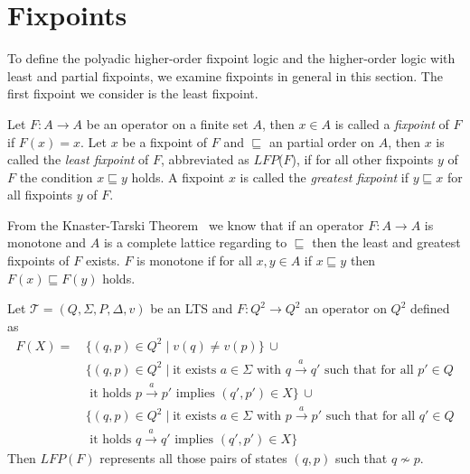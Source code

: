 
\section{Fixpoints}\label{sec:fixpoints}

To define the polyadic higher-order fixpoint logic and the higher-order logic with least and partial fixpoints, we examine fixpoints in general in this section. The first fixpoint we consider is the least fixpoint.

\begin{definition}
   Let $F\colon A \rightarrow A$ be an operator on a finite set $A$, then $x \in A$
   is called a \emph{fixpoint} of $F$ if $F(x) = x$. Let $x$ be a fixpoint of $F$ and $\sqsubseteq$ an partial order on $A$, then $x$ is called the \emph{least
   fixpoint} of $F$, abbreviated as $\mathit{LFP}$($F$), if for all other fixpoints $y$ of $F$ the condition $x
   \sqsubseteq y$ holds. A fixpoint $x$ is called the \emph{greatest fixpoint} if $y \sqsubseteq x$ for all fixpoints $y$ of $F$.
\end{definition}

From the Knaster-Tarski Theorem~\cite{tarski1955lattice} we know that if an operator $F\colon A \rightarrow 
A$ is monotone and $A$ is a complete lattice regarding to $\sqsubseteq$ then the least and greatest fixpoints of $F$ exists. $F$ is monotone if for all $x, y
 \in A$ if $x \sqsubseteq y$ then $F(x) \sqsubseteq F(y)$ holds.

\begin{example}
    \label{example:lfp} Let $\mathcal{T} = (Q, \Sigma, P, \Delta, v)$ be an LTS and $F: Q^2 \rightarrow Q^2$ an operator on $Q^2$ defined as 
\begin{align*}
    F(X) =\, &\{(q, p) \in Q^2 \mid v(q) \neq v(p)\}\, \cup \\&
    \{(q,p) \in Q^2 \mid \text{it exists } a\in\Sigma \text{ with } q\overset{a}{\rightarrow} q' \text{ such that for all } p' \in Q \\&\text{ it holds } p\overset{a}{\rightarrow} p' \text{ implies } (q', p') \in X\}\,\cup \\&\{(q,p) \in Q^2 \mid  \text{it exists } a\in\Sigma \text{ with } p\overset{a}{\rightarrow} p' \text{ such that for all } q' \in Q \\&\text{ it holds } q\overset{a}{\rightarrow} q' \text{ implies } (q', p') \in X\}
\end{align*}   
Then $LFP(F)$ represents all those pairs of states $(q, p)$ such that $q\not\sim p$.
\end{example}

